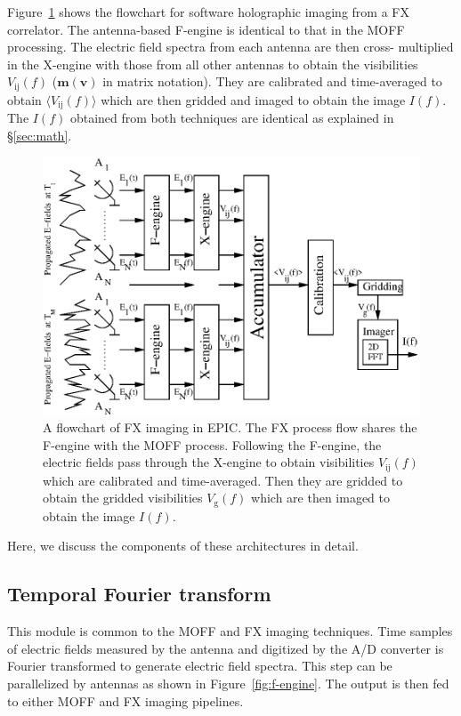 \documentclass[a4paper,fleqn,usenatbib]{../mnras}
\begin{document}
Figure~\ref{fig:FX-flowchart} shows the flowchart for software holographic
imaging from a FX correlator. The antenna-based F-engine is identical to that in
the MOFF processing. The electric field spectra from each antenna are then cross-
multiplied in the X-engine with those from all other antennas to obtain the
visibilities $V_\textrm{ij}(f)$ ($\mathbf{m}(\mathbf{v})$ in matrix notation).
They are calibrated and time-averaged to obtain $\langle V_\textrm{ij}(f)\rangle$
which are then gridded and imaged to obtain the image $I(f)$. The $I(f)$ obtained
from both techniques are identical as explained in \S\ref{sec:math}.
\begin{figure}
  \includegraphics[width=\columnwidth]{FX_flowchart.eps}
  \caption{A flowchart of FX imaging in EPIC. The FX process flow shares the
    F-engine with the MOFF process. Following the F-engine, the electric fields
    pass through the X-engine to obtain visibilities $V_\textrm{ij}(f)$ which are
    calibrated and time-averaged. Then they are gridded to obtain the gridded
    visibilities $V_\textrm{g}(f)$ which are then imaged to obtain the image
    $I(f)$.}
  \label{fig:FX-flowchart}
\end{figure}

Here, we discuss the components of these architectures in detail. 

\subsection{Temporal Fourier transform}\label{sec:F-engine}

This module is common to the MOFF and FX imaging techniques. Time samples of
electric fields measured by the antenna and digitized by the A/D converter is
Fourier transformed to generate electric field spectra. This step can be
parallelized by antennas as shown in Figure~\ref{fig:f-engine}. The output is
then fed to either MOFF and FX imaging pipelines.
\end{document}
